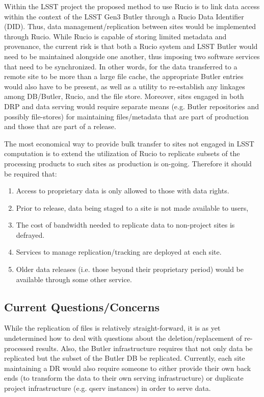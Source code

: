 Within the LSST project the proposed method to use Rucio is to link data access within the context 
of the LSST Gen3 Butler through a Rucio Data Identifier (DID).  Thus, data management/replication 
between sites would be implemented through Rucio.  While Rucio is capable of storing limited metadata 
and provenance, the current risk is that both a Rucio system and LSST Butler would need to be 
maintained alongside one another, thus imposing two software services that need to be synchronized.  
In other words, for the data transferred to a remote site to be more than a large file cache, the 
appropriate Butler entries would also have to be present, as well as a utility to re-establish 
any linkages among DB/Butler, Rucio, and the file store.  Moreover, sites engaged in both DRP and 
data serving would require separate 
means (e.g. Butler repositories and possibly file-stores) for maintaining files/metadata that are 
part of production and those that are part of a release.  

The most economical way to provide bulk transfer to sites not engaged in LSST computation is to 
extend the utilization of Rucio to replicate subsets of the processing products to such sites as 
production is on-going.  Therefore it should be required that:
\begin{enumerate}
\item Access to proprietary data is only allowed to those with data rights.
\item Prior to release, data being staged to a site is not made available to users,
\item The cost of bandwidth needed to replicate data to non-project sites is defrayed.
\item Services to manage replication/tracking are deployed at each site.
\item Older data releases (i.e. those beyond their proprietary period) would be available through some other service.
\end{enumerate}

\subsection{Current Questions/Concerns}
While the replication of files is relatively straight-forward, it is as yet undetermined how to deal
with questions about the deletion/replacement of re-processed results.  Also, the Butler infrastructure 
requires that not only data be replicated but the subset of the Butler DB be replicated.  Currently, each 
site maintaining a DR would also require someone to either provide their own back ends (to transform the data 
to their own serving infrastructure) or duplicate project infrastructure (e.g. qserv instances) in order
to serve data.








